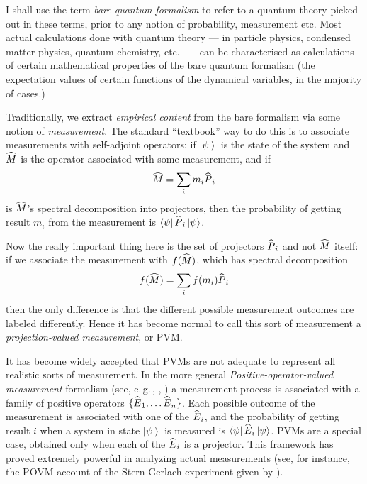 \documentclass[12pt]{article}
\newcommand{\egc}{\mbox{e.\,g.\,}}
\newcommand{\etc}{etc.\,\ }
\newcommand{\be}{\begin{equation}}
\newcommand{\ee}{\end{equation}}
\newcommand{\ket}[1]{\ensuremath{\left|  #1 \right\rangle}}
\newcommand{\bra}[1]{\ensuremath{\left\langle #1 \right|}}
\newcommand{\matel}[3]{\ensuremath{\bra{#1} #2 \ket{#3}}}
\newcommand{\op}[1]{\ensuremath{\widehat{\textsf{\ensuremath{#1}}}}}
\begin{document}
I shall use the term \emph{bare quantum formalism} to refer to a quantum theory picked out in these terms, prior to any notion of probability, measurement etc. Most actual calculations done with quantum theory --- in particle physics, condensed matter physics, quantum chemistry, \etc  --- can be characterised as calculations of certain mathematical properties of the bare quantum formalism (the expectation values of certain functions of the dynamical variables, in the majority of cases.)

Traditionally, we extract \emph{empirical content} from the bare formalism via some notion of \emph{measurement}. The standard ``textbook'' way to do this is to associate measurements with self-adjoint operators: if \ket{\psi} is the state of the system and \op{M} is the operator associated with some measurement, and if 
\be
\op{M}=\sum_i m_i \op{P}_i
\ee
is \op{M}'s spectral decomposition into projectors, then the probability of getting result $m_i$ from the measurement is $\matel{\psi}{\op{P}_i}{\psi}$. 

Now the really important thing here is the set of projectors $\op{P}_i$ and not $\op{M}$ itself: if we associate the measurement with $f(\op{M})$, which has spectral decomposition
\be
f(\op{M})=\sum_i f(m_i) \op{P}_i
\ee
then the only difference is that the different possible measurement outcomes are labeled differently. Hence it has become normal to call this sort of measurement a \emph{projection-valued measurement}, or PVM.

It has become widely accepted that PVMs are not adequate to represent all realistic sorts of measurement. In the more general  \emph{Positive-operator-valued measurement} formalism (see, \egc, , ) a measurement process is associated with a family of positive operators $\{\op{E}_1, \ldots \op{E}_n\}$.
Each possible outcome of the measurement is associated with one of the $\op{E}_i$, and the probability of getting result $i$ when a system in state \ket{\psi} is measured is \matel{\psi}{\op{E}_i}{\psi}. PVMs are a special case, obtained only when each of the $\op{E}_i$ is a projector. This framework has proved extremely powerful in analyzing actual measurements (see, for instance, the POVM account of the Stern-Gerlach experiment given by ).
\end{document}
